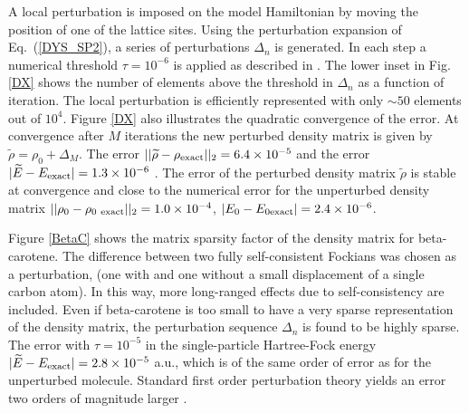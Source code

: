 \documentclass[prl,aps,twocolumn,showpacs,twocolumngrid,superbib]{revtex4}
\begin{document}
A local perturbation is imposed on the model Hamiltonian
by moving the position of one of the lattice sites.
Using the perturbation expansion of Eq.\ (\ref{DYS_SP2}),
a series of perturbations $\Delta_n$ is generated. In each 
step a numerical threshold $\tau = 10^{-6}$ is applied as described in
\cite{NiklassonSP4}.  The lower inset in Fig.  \ref{DX} shows 
the number of elements above the threshold in $\Delta_n$ 
as a function of iteration. The local perturbation
is efficiently represented with only $\sim 50$ elements out of $10^4$.
Figure \ref{DX} also illustrates the quadratic convergence
of the error.  At convergence after 
$M$ iterations the new perturbed density matrix is given by
${\widetilde \rho} = \rho_0 + \Delta_M$. The error 
$||{\widetilde \rho} - \rho_{\rm exact}||_2 = 6.4 \times 10^{-5}$
and the error $|{\widetilde E} - E_{\rm exact}| = 1.3 \times 10^{-6}$
\cite{first_order}.  The error of the perturbed density matrix 
${\widetilde \rho}$ is stable at convergence and close to the numerical error 
for the unperturbed density matrix 
$||\rho_0 - \rho_{0\rm ~exact}||_2 = 1.0 \times 10^{-4}$,
$|{E}_0 - E_{0 \rm exact}| = 2.4 \times 10^{-6}$.

Figure \ref{BetaC} shows the matrix sparsity factor of the
density matrix for beta-carotene. The difference between two fully 
self-consistent Fockians was chosen as a perturbation, 
(one with and one without a small displacement of a single carbon atom). 
In this way, more long-ranged effects due 
to self-consistency are included. Even if beta-carotene
is too small to have a very sparse representation of the density matrix, 
the perturbation sequence $\Delta_n$ is found to be highly sparse.
The error with $\tau = 10^{-5}$ in the single-particle Hartree-Fock energy 
$|{\widetilde E} - E_{\rm exact}| = 2.8 \times 10^{-5}$ a.u., which is of the
same order of error as for the unperturbed molecule. Standard first
order perturbation theory yields an error two orders of magnitude 
larger \cite{first}.
\end{document}
